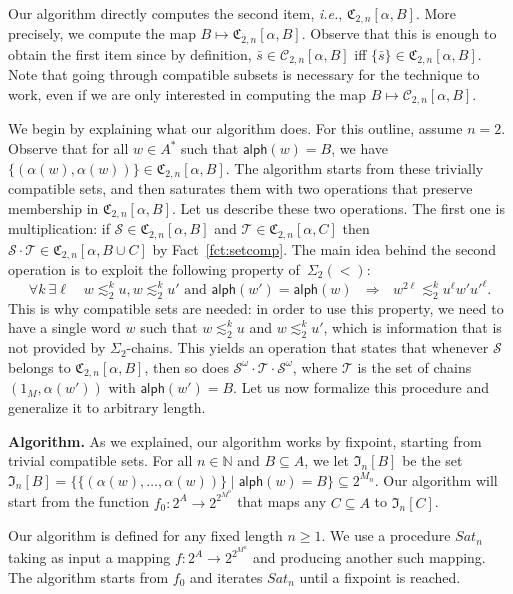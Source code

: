 \documentclass[envcountsame]{llncs}
\newcommand\nat{\ensuremath{\mathbb{N}}\xspace}
\newcommand\Cs{\ensuremath{\mathcal{C}}\xspace}
\newcommand\Cstwolen[1]{\ensuremath{\Cs_{2,#1}}\xspace}
\newcommand\Cstwon{\ensuremath{\Cstwolen{n}}\xspace}
\newcommand\fCtwon{\ensuremath{\fC_{2,n}}\xspace}
\newcommand\Ss{\ensuremath{\mathcal{S}}\xspace}
\newcommand\Ts{\ensuremath{\mathcal{T}}\xspace}
\newcommand{\sic}[1]{\ensuremath{\Sigma_{#1}}\xspace}
\newcommand{\siwd}{\ensuremath{\Sigma_{2}(<)}\xspace}
\newcommand\sieq[2]{\ensuremath{\lesssim^{#1}_{#2}}\xspace}
\newcommand\ksieq[1]{\sieq{k}{#1}}
\newcommand\gmo{\ensuremath{\geqslant}\xspace}
\newcommand\content[1]{\ensuremath{\contentmorphism(#1)}}
\newcommand\contentmorphism{\ensuremath{\textsf{alph}}}
\newcommand\chains{chains\xspace}
\newcommand\qchains[1]{\ensuremath{\sic{#1}}-chains\xspace}
\newcommand\dchains{\qchains{2}}
\newcommand\fI{\ensuremath{\mathfrak I}\xspace}
\newcommand\fC{\ensuremath{\mathfrak C}\xspace}
\begin{document}
Our algorithm directly computes the second item, \emph{i.e.},
$\fCtwon[\alpha,B]$. More precisely, we compute the map $B \mapsto
\fCtwon[\alpha,B]$. Observe that this is enough to obtain
the first item since by definition, $\bar{s} \in \Cstwon[\alpha,B]$
iff $\{\bar{s}\} \in \fCtwon[\alpha,B]$. Note that going through
compatible subsets is necessary for the technique to work, even if we
are only interested in computing the map $B \mapsto \Cstwon[\alpha,B]$.

\medskip
{} We begin by explaining what our algorithm does. For
this outline, assume $n = 2$. Observe that for all $w \in A^*$ such that
$\content{w} = B$, we have $\bigl\{(\alpha(w),\alpha(w))\bigr\} \in
\fCtwon[\alpha,B]$. The algorithm starts from these trivially compatible sets,
and then saturates them with two operations that preserve membership
in $\fCtwon[\alpha,B]$. Let us describe these two operations. The first one is
multiplication: if $\Ss \in \fCtwon[\alpha,B]$ and $\Ts \in \fCtwon[\alpha,C]$
then $\Ss \cdot \Ts \in \fCtwon[\alpha,B\cup C]$ by
Fact~\ref{fct:setcomp}. The main idea behind the second operation is to
exploit the following property of~\siwd:
\[
\forall k\ \exists \ell \text{~~~} w \ksieq{2} u, w \ksieq{2} u' \text{ and } \content{w'} =
\content{w} ~~~\Longrightarrow~~~ w^{2\ell} \ksieq{2} u^\ell w' u'^{\ell}.
\]
This is why compatible sets are needed: in order to use this property,
we need to have a single word $w$ such that $w \ksieq{2} u$ and $w
\ksieq{2} u'$, which is information that is not provided by \dchains. This
yields an operation that states that whenever $\Ss$ belongs to $\fCtwon[\alpha,B]$,
then so does $\Ss^\omega \cdot \Ts \cdot \Ss^\omega$, where $\Ts$ is the set of
\chains $(1_M,\alpha(w'))$ with $\content{w'} = B$. Let us now formalize
this procedure and generalize it to arbitrary length.

\medskip
\noindent
{\bf Algorithm.} As we explained, our algorithm works by fixpoint,
starting from trivial compatible sets. For all $n \in \nat$ and $B
\subseteq A$, we let $\fI_n[B]$ be the set $\fI_n[B] =
\bigl\{\{(\alpha(w),\dots,\alpha(w))\} \mid \content{w} = B\bigr\} \subseteq
2^{M_n}$. Our algorithm will start from the function $f_0:2^A\to2^{2^{M^n}}$
that maps any $C\subseteq A$ to $\fI_n[C]$.

Our algorithm is defined for any fixed length $n \gmo 1$.  We use a procedure
$Sat_n$ taking as input a mapping $f:2^A\to2^{2^{M^n}}$ and producing another such
mapping.  The algorithm starts from $f_0$ and iterates  $Sat_n$
until a fixpoint is reached.
\end{document}
